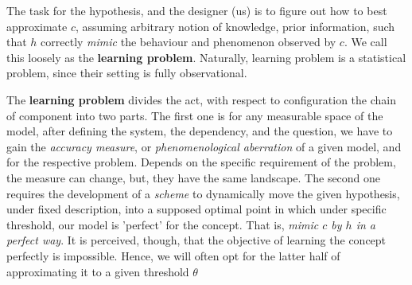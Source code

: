 \documentclass[
  journal=largetwo,
  year=2025,
  volume=37,
]{cup-journal}
\begin{document}
The task for the hypothesis, and the designer (us) is to figure out how to best approximate $c$, assuming arbitrary notion of knowledge, prior information, such that $h$ correctly \textit{mimic} the behaviour and phenomenon observed by $c$. We call this loosely as the \textbf{learning problem}. Naturally, learning problem is a statistical problem, since their setting is fully observational. 

The \textbf{learning problem} divides the act, with respect to configuration the chain of component into two parts. The first one is for any measurable space of the model, after defining the system, the dependency, and the question, we have to gain the \textit{accuracy measure}, or \textit{phenomenological aberration} of a given model, and for the respective problem. Depends on the specific requirement of the problem, the measure can change, but, they have the same landscape. The second one requires the development of a \textit{scheme} to dynamically move the given hypothesis, under fixed description, into a supposed optimal point in which under specific threshold, our model is 'perfect' for the concept. That is, \textit{mimic $c$ by $h$ in a perfect way}. It is perceived, though, that the objective of learning the concept perfectly is impossible. Hence, we will often opt for the latter half of approximating it to a given threshold $\theta$
\end{document}

